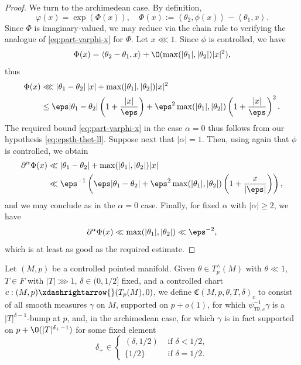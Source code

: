 \begin{proof}
  We turn to the archimedean case.  By definition,
  \begin{equation*}
    \varphi(x) = \exp(\Phi(x)), \quad
    \Phi(x) := \left\langle \theta_2, \phi(x) \right\rangle - \left\langle \theta_1, x \right\rangle.
  \end{equation*}
  Since $\Phi$ is imaginary-valued, we may reduce via the chain rule to verifying the analogue of \eqref{eq:part-varphi-x} for $\Phi$.  Let $x \lll 1$.  Since $\phi$ is controlled, we have
  \begin{equation*}
    \Phi(x) = \langle \theta_2 - \theta_1, x \rangle + \O(\max(|\theta_1|,|\theta_2|) |x|^2),
  \end{equation*}
  thus
  \begin{align*}
    \Phi(x)
    &\lll
      | \theta_1 - \theta_2| \, |x| +
      \max(|\theta_1|, |\theta_2|) |x|^2 \\
    &\leq
      \eps | \theta_1 - \theta_2|  \left( 1 + \frac{|x|}{\eps } \right)
      +
      \eps^2 \max(|\theta_1|, |\theta_2|)
      \left( 1 + \frac{|x|}{\eps } \right)^2.
  \end{align*}
  The required bound \eqref{eq:part-varphi-x} in the case $\alpha = 0$ thus follows from our hypothesis \eqref {eq:epsth-thet-ll}.  Suppose next that $|\alpha| = 1$.  Then, using again that $\phi$ is controlled, we obtain
  \begin{align*}
    \partial^\alpha \Phi(x)
    &\ll |\theta_1 - \theta_2| + \max(|\theta_1|,|\theta_2|) |x| \\
    &\ll \eps^{-1} \left(
      \eps |\theta_1 - \theta_2| +
      \eps^2 \max(|\theta_1|,|\theta_2|) \left( 1 + \frac{x}{|\eps|} \right) \right),
  \end{align*}
  and we may conclude as in the $\alpha = 0$ case.  Finally, for fixed $\alpha$ with $|\alpha| \geq 2$, we have
  \begin{equation*}
    \partial^\alpha \Phi(x)
    \ll \max(|\theta_1|, |\theta_2|) \ll \eps^{-2},
  \end{equation*}
  which is at least as good as the required estimate.
\end{proof}


\begin{definition}\label{defn:standard:let-v-be}
  Let $(M,p)$ be a controlled pointed manifold.  Given $\theta \in T_p^\wedge(M)$ with $\theta \ll 1$, $T \in F$ with $|T| \ggg 1$, $\delta \in (0,1/2]$ fixed, and a controlled chart $c : (M,p) \xdashrightarrow{} (T_p(M),0)$, we define $\mathfrak{C}(M,p,\theta,T,\delta)_c$ to consist of all smooth measures $\gamma$ on $M$, supported on $p + o(1)$, for which $\psi_{T \theta,c}^{-1} \gamma$ is a $|T|^{\delta-1}$-bump at $p$, and, in the archimedean case, for which $\gamma$ is in fact supported on $p + \O(|T|^{\delta_+-1})$ for some fixed element
  \begin{equation}\label{eq:delt-in-beginc-1}
    \delta_+ \in \begin{cases}
      (\delta,1/2) & \text{ if } \delta < 1/2, \\
      \{1/2\} & \text{ if } \delta = 1/2.
    \end{cases}
  \end{equation}
\end{definition}

